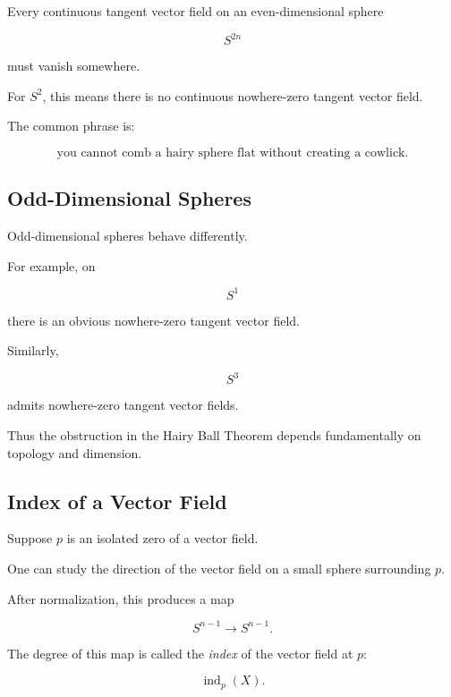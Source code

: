 \begin{theorem}
Every continuous tangent vector field on an even-dimensional sphere

\[
S^{2n}
\]

must vanish somewhere.
\end{theorem}

For \(S^2\), this means there is no continuous nowhere-zero tangent vector
field.

The common phrase is:

\[
\boxed{
\text{you cannot comb a hairy sphere flat without creating a cowlick}.
}
\]

\subsection{Odd-Dimensional Spheres}
\label{subsec:odd-dimensional-sphere-vector-fields}

Odd-dimensional spheres behave differently.

For example, on

\[
S^1
\]

there is an obvious nowhere-zero tangent vector field.

Similarly,

\[
S^3
\]

admits nowhere-zero tangent vector fields.

Thus the obstruction in the Hairy Ball Theorem depends fundamentally on
topology and dimension.

\subsection{Index of a Vector Field}
\label{subsec:index-vector-field}

Suppose \(p\) is an isolated zero of a vector field.

One can study the direction of the vector field on a small sphere
surrounding \(p\).

After normalization, this produces a map

\[
S^{n-1}\to S^{n-1}.
\]

The degree of this map is called the \emph{index} of the vector field at
\(p\):

\[
\boxed{
\operatorname{ind}_p(X).
}
\]

